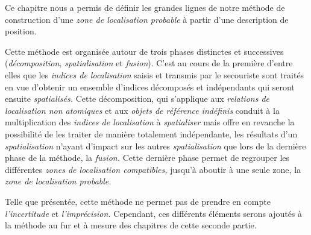 Ce chapitre nous a permis de définir les grandes lignes de notre
méthode de construction d'une \emph{zone de localisation probable} à
partir d'une description de position.

Cette méthode est organisée autour de trois phases distinctes et
successives (\emph{décomposition,} \emph{spatialisation} et
\emph{fusion}). C'est au cours de la première d'entre elles que les
\emph{indices de localisation} saisis et transmis par le secouriste
sont traités en vue d'obtenir un ensemble d'indices décomposés et
indépendants qui seront ensuite \emph{spatialisés.} Cette
décomposition, qui s'applique aux \emph{relations de localisation non
atomiques} et aux \emph{objets de référence indéfinis} conduit à la
multiplication des \emph{indices de localisation} à \emph{spatialiser}
mais offre en revanche la possibilité de les traiter de manière
totalement indépendante, les résultats d'un \emph{spatialisation}
n'ayant d'impact sur les autres \emph{spatialisation} que lors de la
dernière phase de la méthode, la \emph{fusion.}  Cette dernière phase
permet de regrouper les différentes \emph{zones de localisation
compatibles,} jusqu'à aboutir à une seule zone, la \emph{zone de
localisation probable.}

Telle que présentée, cette méthode ne permet pas de prendre en compte
\emph{l'incertitude} et \emph{l'imprécision.} Cependant, ces
différents éléments serons ajoutés à la méthode au fur et à mesure des
chapitres de cette seconde partie.
